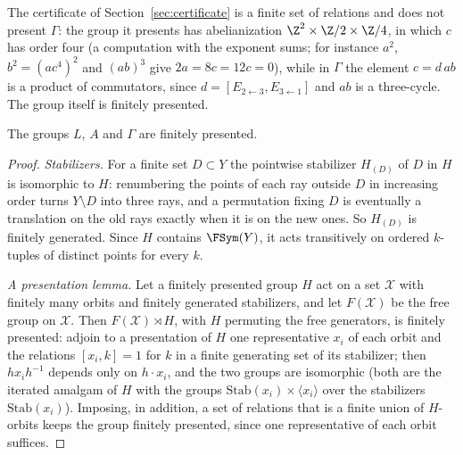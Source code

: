 The certificate of Section~\ref{sec:certificate} is a finite set of relations and does not present $\Gamma$: the group it presents has
abelianization $\Z^2\times\Z/2\times\Z/4$, in which $c$ has order four (a computation with the exponent sums; for instance $a^2$,
$b^2=(ac^4)^2$ and $(ab)^3$ give $2a=8c=12c=0$), while in $\Gamma$ the element $c=d\,ab$ is a product of commutators, since
$d=[E_{2\leftarrow3},E_{3\leftarrow1}]$ and $ab$ is a three-cycle. The group itself is finitely presented.

\begin{proposition}\label{prop:fp}
The groups $L$, $A$ and $\Gamma$ are finitely presented.
\end{proposition}

\begin{proof}
\emph{Stabilizers.} For a finite set $D\subset Y$ the pointwise stabilizer $H_{(D)}$ of $D$ in $H$ is isomorphic to $H$: renumbering the points of each
ray outside $D$ in increasing order turns $Y\setminus D$ into three rays, and a permutation fixing $D$ is eventually a translation on the old rays
exactly when it is on the new ones. So $H_{(D)}$ is finitely generated. Since $H$ contains $\FSym(Y)$, it acts transitively on ordered $k$-tuples of
distinct points for every $k$.

\emph{A presentation lemma.} Let a finitely presented group $H$ act on a set $\mathcal X$ with finitely many orbits and finitely generated
stabilizers, and let $F(\mathcal X)$ be the free group on $\mathcal X$. Then $F(\mathcal X)\rtimes H$, with $H$ permuting the free generators, is
finitely presented: adjoin to a presentation of $H$ one representative $x_i$ of each orbit and the relations $[x_i,k]=1$ for $k$ in a finite
generating set of its stabilizer; then $hx_ih^{-1}$ depends only on $h\cdot x_i$, and the two groups are isomorphic (both are the iterated amalgam of $H$ with the groups
$\mathrm{Stab}(x_i)\times\langle x_i\rangle$ over the stabilizers $\mathrm{Stab}(x_i)$). Imposing, in addition, a set of
relations that is a finite union of $H$-orbits keeps the group finitely presented, since one representative of each orbit suffices.


\end{proof}
